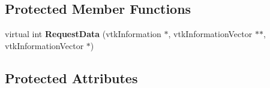 \subsection*{Protected Member Functions}
\begin{DoxyCompactItemize}
\item 
\hypertarget{classvtkCollisionDetectionFilter_a7b938f2dc687da6c225081dd78b68e6b}{
virtual int {\bfseries RequestData} (vtkInformation $\ast$, vtkInformationVector $\ast$$\ast$, vtkInformationVector $\ast$)}
\label{classvtkCollisionDetectionFilter_a7b938f2dc687da6c225081dd78b68e6b}

\end{DoxyCompactItemize}
\subsection*{Protected Attributes}
